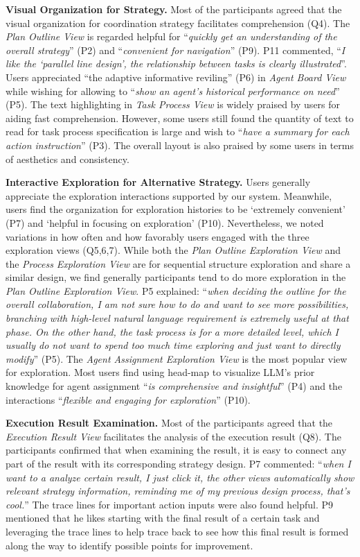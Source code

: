 \textbf{Visual Organization for Strategy.} Most of the participants agreed that the visual organization for coordination strategy facilitates comprehension (Q4). The \textit{Plan Outline View} is regarded helpful for ``\textit{quickly get an understanding of the overall strategy}'' (P2) and ``\textit{convenient for navigation}'' (P9). P11 commented, ``\textit{I like the `parallel line design', the relationship between tasks is clearly illustrated}''. Users appreciated ``the adaptive informative reviling'' (P6) in \textit{Agent Board View} while wishing for allowing to ``\textit{show an agent’s historical performance on need}'' (P5). The text highlighting in \textit{Task Process View} is widely praised by users for aiding fast comprehension. However, some users still found the quantity of text to read for task process specification is large and wish to ``\textit{have a summary for each action instruction}'' (P3). The overall layout is also praised by some users in terms of aesthetics and consistency. 

\textbf{Interactive Exploration for Alternative Strategy.} Users generally appreciate the exploration interactions supported by our system. Meanwhile, users find the organization for exploration histories to be `extremely convenient' (P7) and `helpful in focusing on exploration' (P10). Nevertheless, we noted variations in how often and how favorably users engaged with the three exploration views (Q5,6,7). While both the \textit{Plan Outline Exploration View} and the \textit{Process Exploration View} are for sequential structure exploration and share a similar design, we find generally participants tend to do more exploration in the \textit{Plan Outline Exploration View}. P5 explained: ``\textit{when deciding the outline for the overall collaboration, I am not sure how to do and want to see more possibilities, branching with high-level natural language requirement is extremely useful at that phase. On the other hand, the task process is for a more detailed level, which I usually do not want to spend too much time exploring and just want to directly modify}'' (P5). The \textit{Agent Assignment Exploration View} is the most popular view for exploration. Most users find using head-map to visualize LLM's prior knowledge for agent assignment ``\textit{is comprehensive and insightful}'' (P4) and the interactions ``\textit{flexible and engaging for exploration}'' (P10). 


\textbf{Execution Result Examination.} Most of the participants agreed that the \textit{Execution Result View} facilitates the analysis of the execution result (Q8). The participants confirmed that when examining the result, it is easy to connect any part of the result with its corresponding strategy design. P7 commented: ``\textit{when I want to a analyze certain result, I just click it, the other views automatically show relevant strategy information, reminding me of my previous design process, that's cool.}'' The trace lines for important action inputs were also found helpful. P9 mentioned that he likes starting with the final result of a certain task and leveraging the trace lines to help trace back to see how this final result is formed along the way to identify possible points for improvement.

